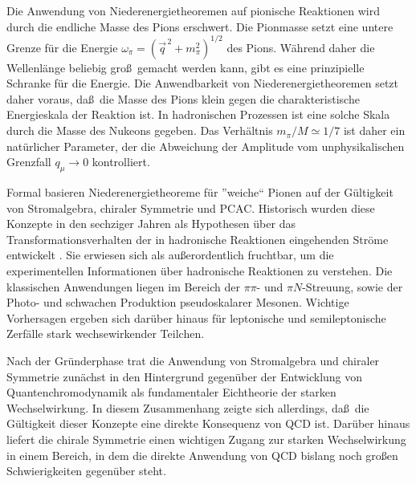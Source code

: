 Die Anwendung von Niederenergietheoremen auf pionische 
Reaktionen wird durch die endliche Masse des Pions 
erschwert. Die Pionmasse setzt eine untere Grenze f\"ur 
die Energie  $\omega_\pi=(\vec{q}^{\, 2} +m_\pi^2)^{1/2}$
des Pions. W\"ahrend daher die Wellenl\"ange beliebig gro\ss\
gemacht werden kann, gibt es eine prinzipielle Schranke 
f\"ur die Energie. Die Anwendbarkeit von Niederenergietheoremen
setzt daher voraus,
da\ss\ die Masse des Pions klein gegen die charakteristische
Energieskala der Reaktion ist. In hadronischen Prozessen ist
eine solche Skala durch die Masse des Nukeons gegeben. 
Das Verh\"altnis $m_\pi/M\simeq 1/7$ ist daher ein nat\"urlicher
Parameter, der die Abweichung der  Amplitude vom unphysikalischen
Grenzfall $q_\mu \to 0$ kontrolliert.

Formal basieren Niederenergietheoreme f\"ur ''weiche`` Pionen auf
der G\"ultigkeit von Stromalgebra, chiraler Symmetrie und
PCAC. Historisch wurden diese Konzepte in den sechziger Jahren 
als Hypothesen \"uber das Transformationsverhalten der in
hadronische Reaktionen eingehenden Str\"ome entwickelt
\cite{AD68,AFF73}. Sie erwiesen sich als au\ss erordentlich
fruchtbar, um die  experimentellen 
Informationen \"uber hadronische Reaktionen zu verstehen. 
Die klassischen Anwendungen liegen im Bereich
der $\pi\pi$- und $\pi N$-Streuung, sowie der Photo- und schwachen
Produktion pseudoskalarer Mesonen. Wichtige Vorhersagen ergeben
sich dar\"uber hinaus f\"ur leptonische und semileptonische Zerf\"alle
stark wechsewirkender Teilchen.    
  
Nach der Gr\"underphase trat die Anwendung von Stromalgebra und
chiraler Symmetrie zun\"achst in den Hintergrund gegen\"uber
der Entwicklung von Quantenchromodynamik als fundamentaler
Eichtheorie der starken Wechselwirkung. In diesem Zusammenhang 
zeigte sich allerdings, da\ss\ die G\"ultigkeit dieser Konzepte eine direkte
Konsequenz von QCD ist. Dar\"uber hinaus liefert die chirale 
Symmetrie  einen wichtigen Zugang zur starken Wechselwirkung
in einem Bereich, in dem die direkte Anwendung von QCD
bislang noch gro\ss en Schwierigkeiten gegen\"uber steht.

